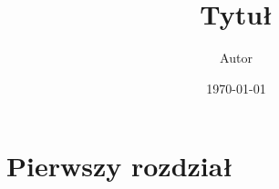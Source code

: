 \documentclass[a4paper,12pt]{article}
\title{Tytuł}
\author{Autor}
\date{\today}
\begin{document}
\maketitle
{
\setcounter{tocdepth}{3}
\tableofcontents
\newpage
{} 
}

\section{Pierwszy rozdział}


% 
% 
\end{document}
